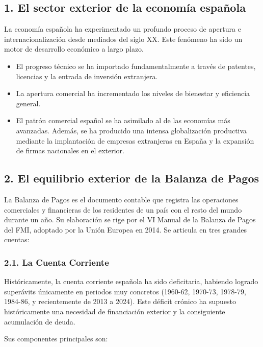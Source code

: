 \subsection*{1. El sector exterior de la economía española}

La economía española ha experimentado un profundo proceso de apertura e internacionalización desde mediados del siglo XX. Este fenómeno ha sido un motor de desarrollo económico a largo plazo.

\begin{itemize}
  \item El progreso técnico se ha importado fundamentalmente a través de patentes, licencias y la entrada de inversión extranjera.
  \item La apertura comercial ha incrementado los niveles de bienestar y eficiencia general.
  \item El patrón comercial español se ha asimilado al de las economías más avanzadas. Además, se ha producido una intensa globalización productiva mediante la implantación de empresas extranjeras en España y la expansión de firmas nacionales en el exterior.
\end{itemize}

\subsection*{2. El equilibrio exterior de la Balanza de Pagos}

La Balanza de Pagos es el documento contable que registra las operaciones comerciales y financieras de los residentes de un país con el resto del mundo durante un año. Su elaboración se rige por el VI Manual de la Balanza de Pagos del FMI, adoptado por la Unión Europea en 2014. Se articula en tres grandes cuentas:

\subsubsection*{2.1. La Cuenta Corriente}

Históricamente, la cuenta corriente española ha sido deficitaria, habiendo logrado superávits únicamente en periodos muy concretos (1960-62, 1970-73, 1978-79, 1984-86, y recientemente de 2013 a 2024). Este déficit crónico ha supuesto históricamente una necesidad de financiación exterior y la consiguiente acumulación de deuda.

Sus componentes principales son:

